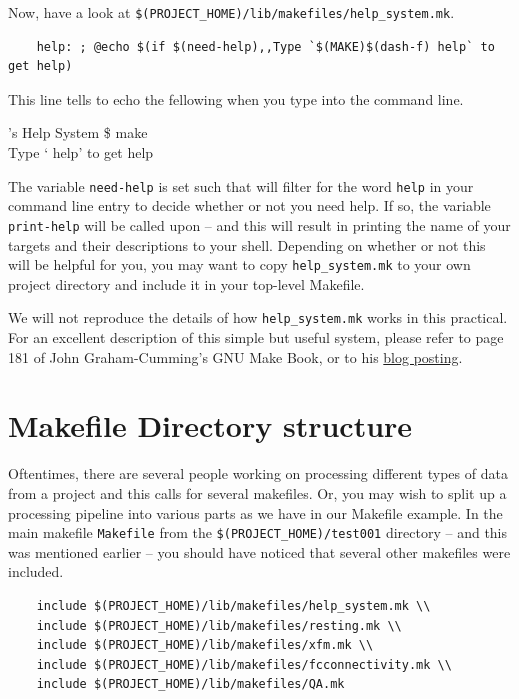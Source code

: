 Now, have a look at \texttt{\$(PROJECT_HOME)/lib/makefiles/help_system.mk}.
\begin{lstlisting}
	help: ; @echo $(if $(need-help),,Type `$(MAKE)$(dash-f) help` to get help)
\end{lstlisting}

This line tells \maken{} to echo the fellowing when you type \maken{} into the command line.
\begin{bash}{\maken{}'s Help System}{}
\$ make \\
Type `\maken{} help' to get help
\end{bash}

The variable \texttt{need-help} is set such that \maken{} will filter for the word \texttt{help} in your command line entry to decide whether or not you need help. If so, the variable \texttt{print-help} will be called upon -- and this will result in \maken{} printing the name of your targets and their descriptions to your shell. Depending on whether or not this will be helpful for you, you may want to copy \texttt{help_system.mk} to your own project directory and include it in your top-level Makefile. 

We will not reproduce the details of how \texttt{help_system.mk} works in this practical. For an excellent description of this simple but useful system, please refer to page 181 of John Graham-Cumming's GNU Make Book, or to his \href{http://www.cmcrossroads.com/article/self-documenting-makefiles}{blog posting}.  

\section{Makefile Directory structure}
Oftentimes, there are several people working on processing different types of data from a project and this calls for several makefiles. Or, you may wish to split up a processing pipeline into various parts as we have in our Makefile example. In the main makefile \texttt{Makefile} from the \texttt{\$(PROJECT_HOME)/test001} directory -- and this was mentioned earlier -- you should have noticed that several other makefiles were included. 

\begin{lstlisting}
	include $(PROJECT_HOME)/lib/makefiles/help_system.mk \\
	include $(PROJECT_HOME)/lib/makefiles/resting.mk \\
	include $(PROJECT_HOME)/lib/makefiles/xfm.mk \\
	include $(PROJECT_HOME)/lib/makefiles/fcconnectivity.mk \\
	include $(PROJECT_HOME)/lib/makefiles/QA.mk 
\end{lstlisting}

